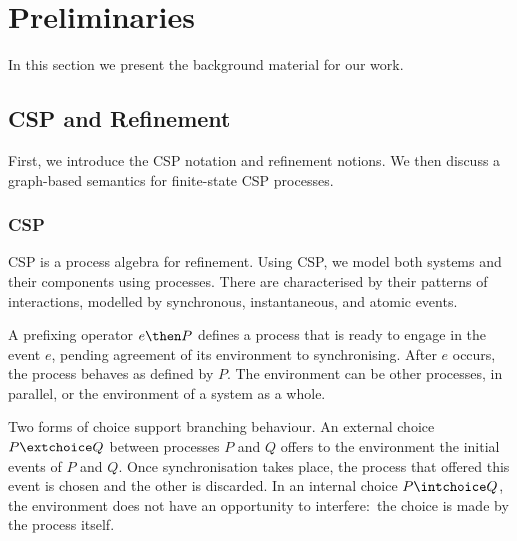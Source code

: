 \section{Preliminaries}
\label{section:preliminaries}

In this section we present the background material for our work.

\subsection{CSP and Refinement}

First, we introduce the CSP notation and refinement notions. We then discuss
a graph-based semantics for finite-state CSP processes.

\subsubsection*{CSP}
\label{section:CSP}

CSP is a process algebra for refinement. Using CSP, we model both systems and
their components using processes. There are characterised by their patterns
of interactions, modelled by synchronous, instantaneous, and atomic events.

A prefixing operator $e \then P$ defines a process that is ready to engage in
the event $e$, pending agreement of its environment to synchronising. After
$e$ occurs, the process behaves as defined by $P$. The environment can be
other processes, in parallel, or the environment of a system as a whole.

Two forms of choice support branching behaviour. An external choice $P
\extchoice Q$ between processes $P$ and $Q$ offers to the environment the
initial events of $P$ and $Q$. Once synchronisation takes place, the process
that offered this event is chosen and the other is discarded. In an internal
choice $P \intchoice Q$, the environment does not have an opportunity to
interfere:~the choice is made by the process itself.


